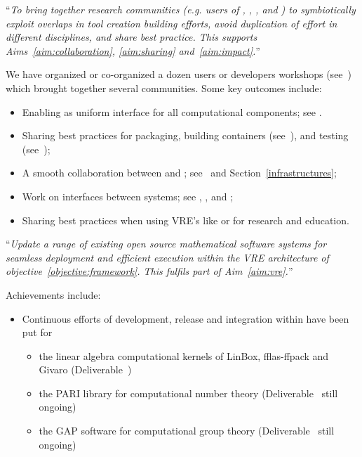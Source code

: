 \begin{compactenum}[\bf O1\rm:]
\item \label{objective:community} ``\emph{To bring together research
  communities (e.g. users of \Jupyter, \Sage, \Singular, and \GAP) to
  symbiotically exploit overlaps in tool creation building efforts,
  avoid duplication of effort in different disciplines, and share best
  practice. This supports Aims~\ref{aim:collaboration},
  \ref{aim:sharing} and~\ref{aim:impact}.}''

  We have organized or co-organized a dozen users or developers
  workshops (see~) which brought
  together several communities. Some key outcomes include:
  \begin{itemize}
  \item Enabling \Jupyter as uniform interface for all computational components; see
    .
  \item Sharing best practices for packaging, building containers
    (see~), and
    testing
    (see~);
  \item A smooth collaboration between \JupyterHub and \SMC;
    see~ and
    Section~\ref{infrastructures};
  \item Work on interfaces between systems; see
    , ,
    and ;
  \item Sharing best practices when using VRE's like \cocalc or \Jupyter for research and
    education.
  \end{itemize}

\item \label{objective:updates} ``\emph{Update a range of existing open source
  mathematical software systems for seamless deployment and efficient
  execution within the VRE architecture of objective~\ref{objective:framework}.
  This fulfils part of Aim~\ref{aim:vre}.}''

  Achievements include:

  \begin{itemize}
  \item Continuous efforts of development, release and integration within \Sage
    have been put for
    \begin{itemize}
    \item  the linear algebra computational kernels of LinBox,
    fflas-ffpack and Givaro (Deliverable~)
    \item the PARI library for computational number theory
    (Deliverable~ still ongoing)
    \item the GAP software for computational group theory
    (Deliverable~ still ongoing)
        \end{itemize}


\end{itemize}
\end{compactenum}
